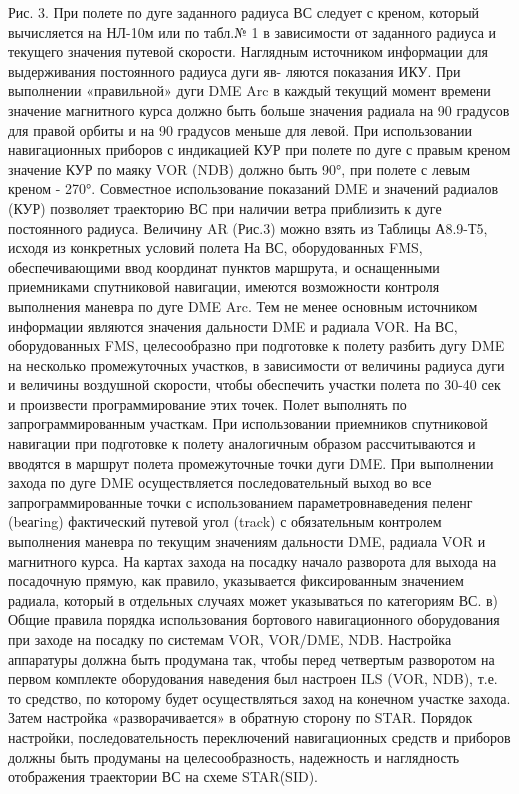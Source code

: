   
Рис. 3.	При полете по дуге заданного радиуса ВС следует с креном, который вычисляется на НЛ-10м или по табл.№ 1 в зависимости от заданного радиуса и текущего значения путевой скорости.
Наглядным источником информации для выдерживания постоянного радиуса дуги яв- ляются показания ИКУ. При выполнении «правильной» дуги DME Arc в каждый текущий момент времени значение магнитного курса должно быть больше значения радиала на 90 градусов для правой орбиты и на 90 градусов меньше для левой. 
При использовании навигационных приборов с индикацией КУР при полете по дуге с правым креном значение КУР по маяку VOR (NDB) должно быть 90°, при полете с левым креном - 270°.
Совместное использование показаний DME и значений радиалов (КУР) позволяет траекторию ВС при наличии ветра приблизить к дуге постоянного радиуса.
Величину AR (Рис.3) можно взять из Таблицы А8.9-Т5, исходя из конкретных условий полета 
На ВС, оборудованных FMS, обеспечивающими ввод координат пунктов маршрута, и оснащенными приемниками спутниковой навигации, имеются возможности контроля выполнения маневра по дуге DME Arc. Тем не менее основным источником информации являются значения дальности DME и радиала VOR.
На ВС, оборудованных FMS, целесообразно при подготовке к полету разбить дугу DME на несколько промежуточных участков, в зависимости от величины радиуса дуги и величины воздушной скорости, чтобы обеспечить участки полета по 30-40 сек и произвести программирование этих точек. Полет выполнять по запрограммированным участкам.
При использовании приемников спутниковой навигации при подготовке к полету аналогичным образом рассчитываются и вводятся в маршрут полета промежуточные точки дуги DME. При выполнении захода по дуге DME осуществляется последовательный выход во все запрограммированные точки с использованием параметровнаведения пеленг (bеагing) фактический путевой угол (track) с обязательным контролем выполнения маневра по текущим значениям дальности DME, радиала VOR и магнитного курса.
На картах захода на посадку начало разворота для выхода на посадочную прямую, как правило, указывается фиксированным значением радиала, который в отдельных случаях может указываться по категориям ВС.
в)	Общие правила порядка использования бортового навигационного оборудования при заходе на посадку по системам VOR, VOR/DME, NDB.
Настройка аппаратуры должна быть продумана так, чтобы перед четвертым разворотом на первом комплекте оборудования наведения был настроен ILS (VOR, NDB), т.е. то средство, по которому будет осуществляться заход на конечном участке захода. Затем настройка «разворачивается» в обратную сторону по STAR.
Порядок настройки, последовательность переключений навигационных средств и приборов должны быть продуманы на целесообразность, надежность и наглядность отображения траектории ВС на схеме STAR(SID).

